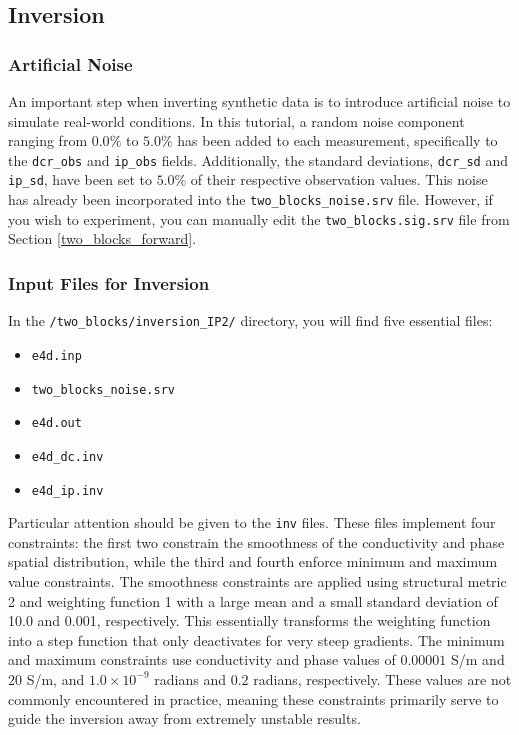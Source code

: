 \documentclass[a4paper,12pt]{article}
\begin{document}
\subsection{Inversion}

\subsubsection{Artificial Noise}

An important step when inverting synthetic data is to introduce artificial noise to simulate real-world conditions. In this tutorial, a random noise component ranging from $0.0\%$ to $5.0\%$ has been added to each measurement, specifically to the \texttt{dcr\_obs} and \texttt{ip\_obs} fields. Additionally, the standard deviations, \texttt{dcr\_sd} and \texttt{ip\_sd}, have been set to $5.0\%$ of their respective observation values. This noise has already been incorporated into the \texttt{two\_blocks\_noise.srv} file. However, if you wish to experiment, you can manually edit the \texttt{two\_blocks.sig.srv} file from Section \ref{two_blocks_forward}.

\subsubsection{Input Files for Inversion}

In the \texttt{/two\_blocks/inversion\_IP2/} directory, you will find five essential files:

\begin{itemize}
    \item \texttt{e4d.inp}
    \item \texttt{two\_blocks\_noise.srv}
    \item \texttt{e4d.out}
    \item \texttt{e4d\_dc.inv}
    \item \texttt{e4d\_ip.inv}
\end{itemize}

Particular attention should be given to the \texttt{inv} files. These files implement four constraints: the first two constrain the smoothness of the conductivity and phase spatial distribution, while the third and fourth enforce minimum and maximum value constraints. The smoothness constraints are applied using structural metric 2 and weighting function 1 with a large mean and a small standard deviation of 10.0 and 0.001, respectively. This essentially transforms the weighting function into a step function that only deactivates for very steep gradients. The minimum and maximum constraints use conductivity and phase values of \(0.00001\) S/m and \(20\) S/m, and \(1.0 \times 10^{-9}\) radians and \(0.2\) radians, respectively. These values are not commonly encountered in practice, meaning these constraints primarily serve to guide the inversion away from extremely unstable results.
\end{document}
